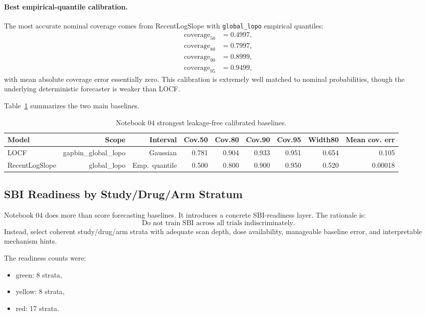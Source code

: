 \documentclass[11pt,a4paper]{article}
\begin{document}
\paragraph{Best empirical-quantile calibration.}
The most accurate nominal coverage comes from RecentLogSlope with \texttt{global\_lopo} empirical quantiles:
\[
\begin{aligned}
    \text{coverage}_{50} &= 0.4997,\\
    \text{coverage}_{80} &= 0.7997,\\
    \text{coverage}_{90} &= 0.8999,\\
    \text{coverage}_{95} &= 0.9499,
\end{aligned}
\]
with mean absolute coverage error essentially zero. This calibration is extremely well matched to nominal probabilities, though the underlying deterministic forecaster is weaker than LOCF.

Table~\ref{tab:n04-calib} summarizes the two main baselines.

\begin{table}[H]
\centering
\small
\caption{Notebook 04 strongest leakage-free calibrated baselines.}
\label{tab:n04-calib}
\begin{tabular}{lrrrrrrrr}
\toprule
Model & Scope & Interval & Cov.50 & Cov.80 & Cov.90 & Cov.95 & Width80 & Mean cov. err \\
\midrule
LOCF & gapbin\_global\_lopo & Gaussian & 0.781 & 0.904 & 0.933 & 0.951 & 0.654 & 0.105 \\
RecentLogSlope & global\_lopo & Emp.\ quantile & 0.500 & 0.800 & 0.900 & 0.950 & 0.520 & 0.00018 \\
\bottomrule
\end{tabular}
\end{table}

\subsection{SBI Readiness by Study/Drug/Arm Stratum}

Notebook 04 does more than score forecasting baselines. It introduces a concrete SBI-readiness layer. The rationale is:
\[
\text{Do not train SBI across all trials indiscriminately.}
\]
Instead, select coherent study/drug/arm strata with adequate scan depth, dose availability, manageable baseline error, and interpretable mechanism hints.

The readiness counts were:
\begin{itemize}[leftmargin=2em]
    \item green: 8 strata,
    \item yellow: 8 strata,
    \item red: 17 strata.
\end{itemize}
\end{document}
